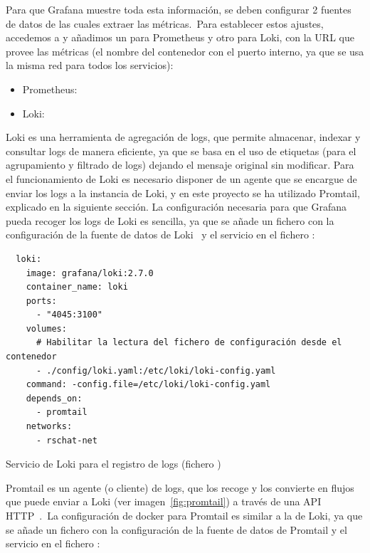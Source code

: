 Para que Grafana muestre toda esta información, se deben configurar 2 fuentes de datos de las cuales extraer las
métricas.\ Para establecer estos ajustes, accedemos a  y añadimos un
 para Prometheus y otro para Loki, con la URL que provee las métricas (el nombre del contenedor con
el puerto interno, ya que se usa la misma red para todos los servicios):

\begin{itemize}
	\item Prometheus: 
	\item Loki: 
\end{itemize}
\label{itm:grafana-data-sources}

Loki es una herramienta de agregación de logs, que permite almacenar, indexar y consultar logs de manera eficiente, ya
que se basa en el uso de etiquetas (para el agrupamiento y filtrado de logs) dejando el mensaje original sin modificar.
Para el funcionamiento de Loki es necesario disponer de un agente que se encargue de enviar los logs a la instancia de
Loki, y en este proyecto se ha utilizado Promtail, explicado en la siguiente sección.
La configuración necesaria para que Grafana pueda recoger los logs de Loki es sencilla, ya que se añade un fichero
 con la configuración de la fuente de datos de Loki~\cite{loki-config-file} y el servicio en el
fichero :

\begin{codeBlock}
	\begin{verbatim}
  loki:
    image: grafana/loki:2.7.0
    container_name: loki
    ports:
      - "4045:3100"
    volumes:
      # Habilitar la lectura del fichero de configuración desde el contenedor
      - ./config/loki.yaml:/etc/loki/loki-config.yaml
    command: -config.file=/etc/loki/loki-config.yaml
    depends_on:
      - promtail
    networks:
      - rschat-net
	\end{verbatim}
	\caption{Servicio de Loki para el registro de logs (fichero )}
\end{codeBlock}
\label{cod:loki-docker-compose}

Promtail es un agente (o cliente) de logs, que los recoge y los convierte en flujos que puede enviar a Loki (ver
imagen~\ref{fig:promtail}) a través de una API HTTP~\cite{loki-docs}.\ La configuración de docker para Promtail es
similar a la de
Loki, ya que se añade un fichero  con la configuración de la fuente de datos de Promtail y el servicio
en el fichero :

